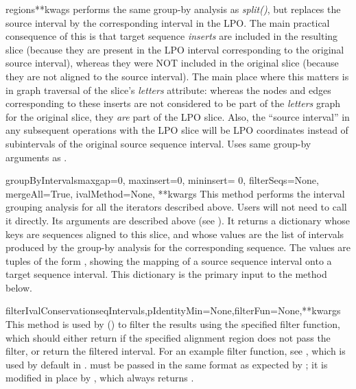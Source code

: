 \documentclass{howto}
\begin{document}
\begin{funcdesc}{regions}{**kwags}
  performs the same group-by analysis as {\em split()}, but replaces
  the source interval by the corresponding interval in the LPO.  The main
  practical consequence of this is that target sequence {\em inserts}
  are included in the resulting slice (because they are present in the LPO
  interval corresponding to the original source interval), whereas they
  were NOT included in the original slice (because they are not aligned
  to the source interval).  The main place where this matters is in graph
  traversal of the slice's {\em letters} attribute: whereas the nodes
  and edges corresponding to these inserts are not considered to be part
  of the {\em letters} graph for the original slice, they {\em are} part of the
  LPO slice.  Also, the ``source interval'' in any subsequent operations
  with the LPO slice will be LPO coordinates instead of subintervals of the
  original source sequence interval.
  Uses same group-by arguments as .
\end{funcdesc}

\begin{funcdesc}{groupByIntervals}{maxgap=0, maxinsert=0, mininsert= 0, filterSeqs=None, mergeAll=True, ivalMethod=None, **kwargs}
  This method performs the interval grouping analysis for all the iterators
  described above.  Users will not need to call it directly.  Its arguments
  are described above (see ).  It returns a dictionary
  whose keys are sequences aligned to this slice, and whose values are
  the list of intervals produced by the group-by analysis for the corresponding
  sequence.  The values are tuples of the form
  , showing the
  mapping of a source sequence interval onto a target sequence interval.
  This dictionary is the primary input to the 
  method below.
\end{funcdesc}

\begin{funcdesc}{filterIvalConservation}{seqIntervals,pIdentityMin=None,filterFun=None,**kwargs}
  This method is used by () to filter the results
  using the specified  filter function, which should either
  return  if the specified alignment region does not pass the filter,
  or return the filtered interval.  For an example
  filter function, see , which is used by default 
  in .   must be passed in
  the same format as expected by ; it is modified in
  place by , which always returns .
\end{funcdesc}
\end{document}

